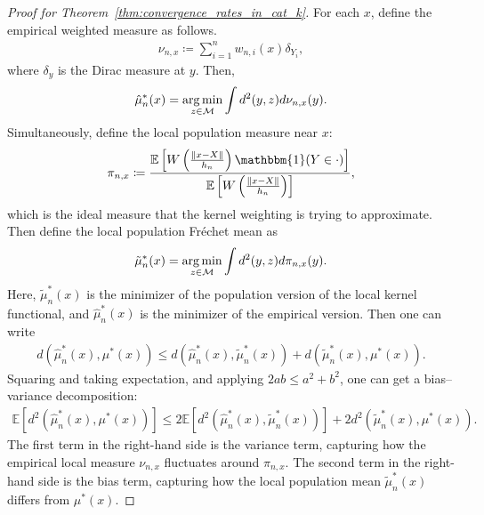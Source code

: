 \begin{proof}[Proof for Theorem~\ref{thm:convergence_rates_in_cat_k}]
    For each $x$, define the empirical weighted measure as follows.
    \begin{align*}
        \nu_{n,x} \coloneqq \sum^n_{i=1}w_{n,i}(x)\delta_{Y_i},
    \end{align*}
    where $\delta_y$ is the Dirac measure at $y$.
    Then,
    \begin{align*}
        \hat{\mu}^*_n(x) = \operatorname*{arg\,min}_{z \in \mathcal{M}}\int d^2(y,z) d\nu_{n,x}(y).
    \end{align*}
    Simultaneously, define the local population measure near $x$:
    \begin{align*}
        \pi_{n,x} \coloneqq \frac{\mathbb{E}\left[W\left(\frac{\| x - X\|}{h_n}\right)\mathbbm{1}(Y \in \cdot)\right]}{\mathbb{E}\left[W\left(\frac{\| x - X\|}{h_n}\right)\right]},
    \end{align*}
    which is the ideal measure that the kernel weighting is trying to approximate.
    Then define the local population Fréchet mean as
    \begin{align*}
        \tilde{\mu}^*_n(x) = \operatorname*{arg\,min}_{z \in \mathcal{M}} \int d^2(y, z) d\pi_{n,x}(y).
    \end{align*}
    Here, $\tilde{\mu}^*_n(x)$ is the minimizer of the population version of the local kernel functional, and $\hat{\mu}^*_n(x)$ is the minimizer of the empirical version.
    Then one can write
    \begin{align*}
        d(\hat{\mu}^*_n(x), \mu^*(x)) \leq d(\hat{\mu}^*_n(x), \tilde{\mu}^*_n(x)) + d(\tilde{\mu}^*_n(x), \mu^*(x)).
    \end{align*}
    Squaring and taking expectation, and applying $2ab \leq a^2 + b^2$, one can get a bias–variance decomposition:
    \begin{align*}
        \mathbb{E}[d^2(\hat{\mu}^*_n(x), \mu^*(x))] \leq 2\mathbb{E}[d^2(\hat{\mu}^*_n(x), \tilde{\mu}^*_n(x))] + 2d^2(\tilde{\mu}^*_n(x), \mu^*(x)).
    \end{align*}
    The first term in the right-hand side is the variance term, capturing how the empirical local measure $\nu_{n,x}$ fluctuates around $\pi_{n,x}$.
    The second term in the right-hand side is the bias term, capturing how the local population mean $\tilde{\mu}^*_n(x)$ differs from $\mu^*(x)$.


\end{proof}
